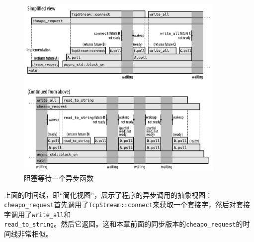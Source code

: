 \begin{figure}[htbp]
    \centering
    \includegraphics[width=0.9\textwidth]{../img/f20-2.png}
    \caption{阻塞等待一个异步函数}
    \label{f20-2}
\end{figure}

上面的时间线，即“简化视图”，展示了程序的异步调用的抽象视图：\texttt{cheapo\_request}首先调用了\texttt{TcpStream::connect}来获取一个套接字，然后对套接字调用了\texttt{write\_all}和\\
\texttt{read\_to\_string}。然后它返回。这和本章前面的同步版本的\texttt{cheapo\_request}的时间线非常相似。

